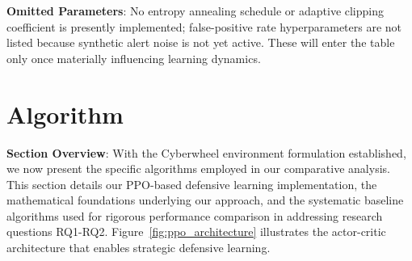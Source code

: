 \documentclass[12pt]{article}
\theoremstyle{definition}
\theoremstyle{plain}
\begin{document}
	\textbf{Omitted Parameters}: No entropy annealing schedule or adaptive clipping coefficient is presently implemented; false-positive rate hyperparameters are not listed because synthetic alert noise is not yet active. These will enter the table only once materially influencing learning dynamics.

\section{Algorithm}

\textbf{Section Overview}: With the Cyberwheel environment formulation established, we now present the specific algorithms employed in our comparative analysis. This section details our PPO-based defensive learning implementation, the mathematical foundations underlying our approach, and the systematic baseline algorithms used for rigorous performance comparison in addressing research questions RQ1-RQ2. Figure~\ref{fig:ppo_architecture} illustrates the actor-critic architecture that enables strategic defensive learning.
\end{document}
